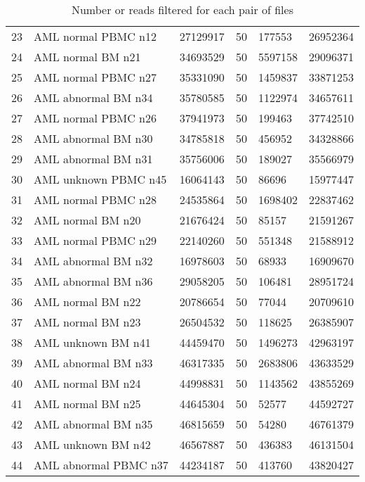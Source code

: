 \documentclass[a4paper]{article}\usepackage[]{graphicx}\usepackage[]{color}
\begin{document}
\begin{table}[ht]
\begin{tabular}{rlllll}
  23 & AML normal PBMC n12 & 27129917 & 50 & 177553 & 26952364 \\ 
  24 & AML normal BM n21 & 34693529 & 50 & 5597158 & 29096371 \\ 
  25 & AML normal PBMC n27 & 35331090 & 50 & 1459837 & 33871253 \\ 
  26 & AML abnormal BM n34 & 35780585 & 50 & 1122974 & 34657611 \\ 
  27 & AML normal PBMC n26 & 37941973 & 50 & 199463 & 37742510 \\ 
  28 & AML abnormal BM n30 & 34785818 & 50 & 456952 & 34328866 \\ 
  29 & AML abnormal BM n31 & 35756006 & 50 & 189027 & 35566979 \\ 
  30 & AML unknown PBMC n45 & 16064143 & 50 & 86696 & 15977447 \\ 
  31 & AML normal PBMC n28 & 24535864 & 50 & 1698402 & 22837462 \\ 
  32 & AML normal BM n20 & 21676424 & 50 & 85157 & 21591267 \\ 
  33 & AML normal PBMC n29 & 22140260 & 50 & 551348 & 21588912 \\ 
  34 & AML abnormal BM n32 & 16978603 & 50 & 68933 & 16909670 \\ 
  35 & AML abnormal BM n36 & 29058205 & 50 & 106481 & 28951724 \\ 
  36 & AML normal BM n22 & 20786654 & 50 & 77044 & 20709610 \\ 
  37 & AML normal BM n23 & 26504532 & 50 & 118625 & 26385907 \\ 
  38 & AML unknown BM n41 & 44459470 & 50 & 1496273 & 42963197 \\ 
  39 & AML abnormal BM n33 & 46317335 & 50 & 2683806 & 43633529 \\ 
  40 & AML normal BM n24 & 44998831 & 50 & 1143562 & 43855269 \\ 
  41 & AML normal BM n25 & 44645304 & 50 & 52577 & 44592727 \\ 
  42 & AML abnormal BM n35 & 46815659 & 50 & 54280 & 46761379 \\ 
  43 & AML unknown BM n42 & 46567887 & 50 & 436383 & 46131504 \\ 
  44 & AML abnormal PBMC n37 & 44234187 & 50 & 413760 & 43820427 \\ 
   \hline
\end{tabular}
\caption{Number or reads filtered for each pair of files} 
\label{listfiltered}
\end{table}
\end{document}
